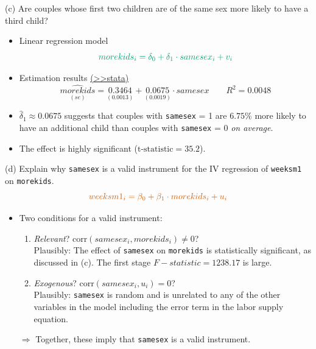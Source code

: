\documentclass[
  10pt,
  ignorenonframetext,
]{beamer}
\providecommand{\tightlist}{%
  \setlength{\itemsep}{0pt}\setlength{\parskip}{0pt}}
\begin{document}
\begin{frame}[fragile]{(c) Are couples whose first two children are of
the same sex more likely to have a third child?}
\protect\hypertarget{q2-regFirstStage}{}
\begin{itemize}
\item
  Linear regression model \[
  \color{green}{morekids_i = \delta_0 + \delta_1 \cdot samesex_i + v_i}
  \]
\item
  Estimation results
  \footnotesize \protect\hyperlink{res2-regFirstStage}{(\textgreater\textgreater stata)}
  \normalsize \[
  \underset{(se)}{\widehat{morekids}} = \underset{(0.0013)}{0.3464} + \underset{(0.0019)}{0.0675} \cdot samesex \qquad R^2=0.0048
  \]
\item
  \(\hat{\delta}_1 \approx 0.0675\) suggests that couples with
  \texttt{samesex} = 1 are \(6.75\%\) more likely to have an additional
  child than couples with \texttt{samesex} = 0 \emph{on average}.
\item
  The effect is highly significant (\(\text{t-statistic} = 35.2\)).
\end{itemize}
\end{frame}

\begin{frame}[fragile]{(d) Explain why \texttt{samesex} is a valid
instrument for the IV regression of \texttt{weeksm1} on
\texttt{morekids}.}
\protect\hypertarget{d-explain-why-samesex-is-a-valid-instrument-for-the-iv-regression-of-weeksm1-on-morekids.}{}
\[
\color{red}{weeksm1_i = \beta_0 + \beta_1 \cdot morekids_i + u_i}
\]

\begin{itemize}
\tightlist
\item
  Two conditions for a valid instrument:

  \begin{enumerate}
  \tightlist
  \item
    \emph{Relevant}? \(\text{corr}(samesex_i,morekids_i) \neq 0\)?\\
    Plausibly: The effect of \texttt{samesex} on \texttt{morekids} is
    statistically significant, as discussed in (c). The first stage
    \(F-statistic = 1238.17\) is large. \vspace{2mm}
  \item
    \emph{Exogenous}? \(\text{corr}(samesex_i,u_i) = 0\)?\\
    Plausibly: \texttt{samesex} is random and is unrelated to any of the
    other variables in the model including the error term in the labor
    supply equation.
  \end{enumerate}

  \vspace{2mm}

  \(\Rightarrow\) Together, these imply that \texttt{samesex} is a valid
  instrument.
\end{itemize}
\end{frame}
\end{document}
